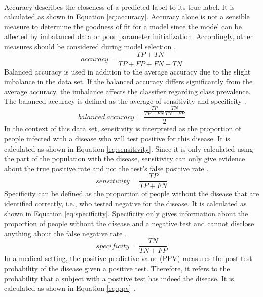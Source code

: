 \\
Accuracy describes the closeness of a predicted label to its true 
label. It is calculated as shown in Equation \ref{eq:accuracy}. Accuracy alone 
is not a sensible measure to determine the goodness of fit for a model since 
the model can be affected by imbalanced data or poor parameter initialization. 
Accordingly, other measures should be considered during model 
selection \cite{RN167}.
\begin{equation}
 accuracy = \frac{TP + TN}{TP+FP+FN+TN}
 \label{eq:accuracy}
\end{equation}
Balanced accuracy is used in addition to the average accuracy due to the slight 
imbalance in the data set. If the balanced accuracy differs significantly from 
the average accuracy, the imbalance affects the classifier regarding 
class prevalence. The balanced accuracy is defined as the average of 
sensitivity and specificity \cite{RN167, RN127}.
\begin{equation}
 balanced \ accuracy = \frac{\frac{TP}{TP+FN}\frac{TN}{TN+FP}}{2}
 \label{eq:balanced_acc}
\end{equation}
In the context of this data set, sensitivity is interpreted as the proportion 
of people infected with a disease who will test positive for this disease. It 
is calculated as shown in Equation \ref{eq:sensitivity}. Since it is only 
calculated using the part of the population with the disease, sensitivity can 
only give evidence about the true positive rate and not the test's false 
positive rate \cite{RN168}.
\begin{equation}
 sensitivity = \frac{TP}{TP+FN}
 \label{eq:sensitivity}
\end{equation}
Specificity can be defined as the proportion of people without the disease that 
are identified correctly, i.e., who tested negative for the disease. It is 
calculated as shown in Equation \ref{eq:specificity}. Specificity only gives 
information about the proportion of people without the disease and a negative 
test and cannot disclose anything about the false negative 
rate \cite{RN168}.
\begin{equation}
 specificity = \frac{TN}{TN+FP}
 \label{eq:specificity}
\end{equation}
In a medical setting, the positive predictive value (PPV) measures the 
post-test probability of the disease given a positive test. Therefore, it 
refers to the probability that a subject with a positive test has indeed the 
disease. It is calculated as shown in Equation \ref{eq:ppv} \cite{RN168}.
